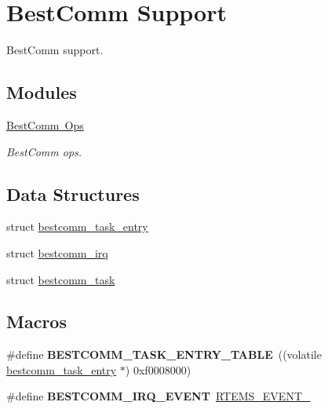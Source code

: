 \hypertarget{group__BestComm}{}\section{Best\+Comm Support}
\label{group__BestComm}


Best\+Comm support.  


\subsection*{Modules}
\begin{DoxyCompactItemize}
\item 
\mbox{\hyperlink{group__BestCommOps}{Best\+Comm Ops}}
\begin{DoxyCompactList}\small\item\em Best\+Comm ops. \end{DoxyCompactList}\end{DoxyCompactItemize}
\subsection*{Data Structures}
\begin{DoxyCompactItemize}
\item 
struct \mbox{\hyperlink{structbestcomm__task__entry}{bestcomm\+\_\+task\+\_\+entry}}
\item 
struct \mbox{\hyperlink{structbestcomm__irq}{bestcomm\+\_\+irq}}
\item 
struct \mbox{\hyperlink{structbestcomm__task}{bestcomm\+\_\+task}}
\end{DoxyCompactItemize}
\subsection*{Macros}
\begin{DoxyCompactItemize}
\item 
\mbox{\label{group__BestComm_gafcaeec3498bcc7e9d0ce0c5e8de4bbac}} 
\#define {\bfseries B\+E\+S\+T\+C\+O\+M\+M\+\_\+\+T\+A\+S\+K\+\_\+\+E\+N\+T\+R\+Y\+\_\+\+T\+A\+B\+LE}~((volatile \mbox{\hyperlink{structbestcomm__task__entry}{bestcomm\+\_\+task\+\_\+entry}} $\ast$) 0xf0008000)
\item 
\mbox{\label{group__BestComm_gadfe2d03f6d335ba8d803aacfa245b5a5}} 
\#define {\bfseries B\+E\+S\+T\+C\+O\+M\+M\+\_\+\+I\+R\+Q\+\_\+\+E\+V\+E\+NT}~\mbox{\hyperlink{group__ClassicEventSet_gadab2e575c5b836fcd51a2d50443fefea}{R\+T\+E\+M\+S\+\_\+\+E\+V\+E\+N\+T\+\_}}
\end{DoxyCompactItemize}
